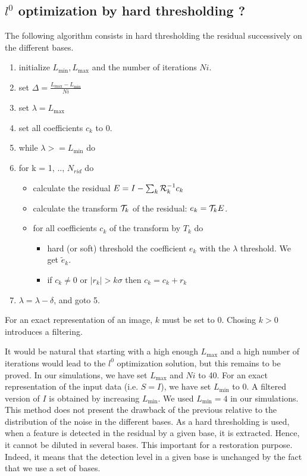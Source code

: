 \documentclass[11pt,draft]{IEEEtran} %
\begin{document}
\subsection{$l^0$ optimization by hard thresholding ?}
\label{sect_l0}
The following algorithm consists in hard thresholding the residual 
successively on the different bases. 
\begin{enumerate}
\item initialize $ L_{\min}, L_{\max}$ and the number of iterations $Ni$.
\item set $\Delta = \frac{L_{\max} - L_{\min}}{Ni}$
\item set $\lambda = L_{\max}$
\item set all coefficients $c_k$ to 0.
\item while $\lambda >= L_{\min}$ do
\item for k = 1, .., $N_{rid}$ do
\begin{itemize}
\item calculate the residual $E = I - \sum_k {\cal R}_k^{-1} c_k$
\item calculate the transform ${\cal T}_k$ of the residual:
$e_k = {\cal T}_k E$.
\item for all coefficients $c_k$ of the transform by $T_k$ do
\begin{itemize}
\item hard (or soft) threshold the coefficient $e_k$ with the $\lambda$ threshold.
We get $\tilde e_k$.
\item if $c_k \ne 0$ or $\mid r_k \mid > k \sigma$ then $c_k = c_k + r_k$
\end{itemize}
\end{itemize}
\item $\lambda = \lambda - \delta$, and goto 5.
\end{enumerate}
For an exact representation of an image, $k$ must be set to 0.
Chosing $k > 0$ introduces a filtering.

It would be natural that starting with a high enough $L_{\max}$  and a high
number of iterations would lead to the $l^0$ optimization solution,
but this remains to be proved.  
In our simulations, we have set $L_{\max}$ and $Ni$ to 40. For an exact
representation of the input data (i.e. $S=I$), we have set 
  $ L_{\min} $ to 0. A filtered version of $I$ is obtained by increasing
$ L_{\min} $. We used $L_{\min} = 4$ in our simulations. 
This method does not present the drawback of the previous relative to the
distribution of the noise in the different bases. As a hard thresholding
is used, when a feature is detected in the residual by a given base, it
is extracted. Hence, it cannot be diluted in several bases. This important
for a restoration purpose. Indeed, it means that the detection level in
a given base is unchanged by the fact that we use a set of bases.
\end{document}
